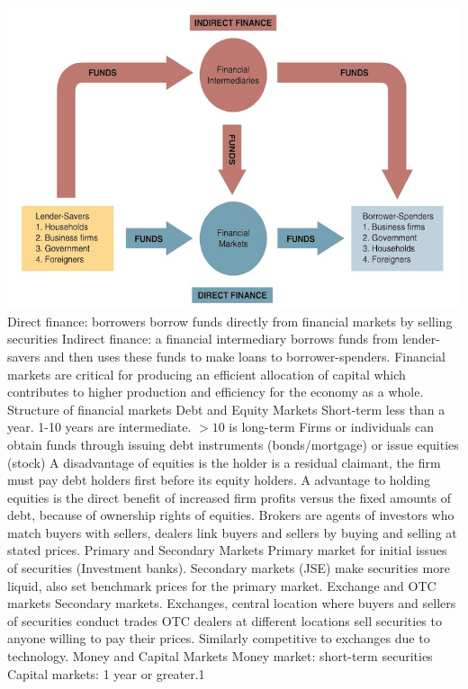 \documentclass[12pt]{examnotes}
\begin{document}
\includegraphics[scale=0.5]{./imgs/21.jpg}
\ra Direct finance: borrowers borrow funds directly from financial markets by selling securities
\ra Indirect finance: a financial intermediary borrows funds from lender-savers and then uses these funds to make loans to borrower-spenders.
\ra Financial markets are critical for producing an efficient allocation of capital which contributes to higher production and efficiency for the economy as a whole.
\ra Structure of financial markets
 Debt and Equity Markets
\rna Short-term less than a year. 1-10 years are intermediate. $>10$ is long-term 
\rna Firms or individuals can obtain funds through issuing debt instruments (bonds/mortgage) or issue equities (stock)
\rna A disadvantage of equities is the holder is a residual claimant, the firm must pay debt holders first before its equity holders. 
\rna A advantage to holding equities is the direct benefit of increased firm profits versus the fixed amounts of debt, because of ownership rights of equities.
\ra Brokers are agents of investors who match buyers with sellers, dealers link buyers and sellers by buying and selling at stated prices. 
 Primary and Secondary Markets
\rna Primary market for initial issues of securities (Investment banks). 
\rna Secondary markets (JSE) make securities more liquid, also set benchmark prices for the primary market. 
 Exchange and OTC markets
\rna Secondary markets.
\rna Exchanges, central location where buyers and sellers of securities conduct trades
\rna OTC dealers  at different locations sell securities to anyone willing to pay their prices. Similarly competitive to exchanges due to technology.
 Money and Capital Markets
\rna Money market: short-term securities
\rna Capital markets: 1 year or greater.1
\end{document}
